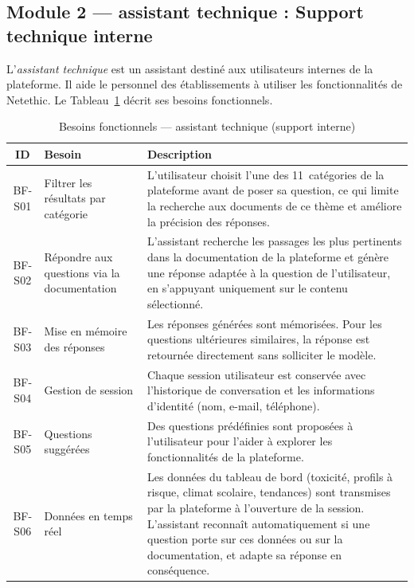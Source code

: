 \subsection{Module 2 — assistant technique : Support technique interne}

L'\textit{assistant technique} est un assistant destiné aux utilisateurs internes de la plateforme.
Il aide le personnel des établissements à utiliser les fonctionnalités de Netethic.
Le Tableau~\ref{tab:bf_nesa} décrit ses besoins fonctionnels.

\vspace{6pt}
\begin{table}[H]
\caption{Besoins fonctionnels — assistant technique (support interne)}
\label{tab:bf_nesa}
\centering
\small
\setlength{\tabcolsep}{4pt}
\begin{tabular}{|c|p{3.5cm}|p{9.5cm}|}
\hline
\textbf{ID} & \textbf{Besoin} & \textbf{Description} \\
\hline
BF-S01 & Filtrer les résultats par catégorie
        & L'utilisateur choisit l'une des 11~catégories de la plateforme avant de poser sa question, ce qui limite la recherche aux documents de ce thème et améliore la précision des réponses. \\
\hline
BF-S02 & Répondre aux questions via la documentation
        & L'assistant recherche les passages les plus pertinents dans la documentation de la plateforme et génère une réponse adaptée à la question de l'utilisateur, en s'appuyant uniquement sur le contenu sélectionné. \\
\hline
BF-S03 & Mise en mémoire des réponses
        & Les réponses générées sont mémorisées. Pour les questions ultérieures similaires, la réponse est retournée directement sans solliciter le modèle. \\
\hline
BF-S04 & Gestion de session
        & Chaque session utilisateur est conservée avec l'historique de conversation et les informations d'identité (nom, e-mail, téléphone). \\
\hline
BF-S05 & Questions suggérées
        & Des questions prédéfinies sont proposées à l'utilisateur pour l'aider à explorer les fonctionnalités de la plateforme. \\
\hline
BF-S06 & Données en temps réel
        & Les données du tableau de bord (toxicité, profils à risque, climat scolaire, tendances) sont transmises par la plateforme à l'ouverture de la session. L'assistant reconnaît automatiquement si une question porte sur ces données ou sur la documentation, et adapte sa réponse en conséquence. \\

\end{tabular}
\end{table}

